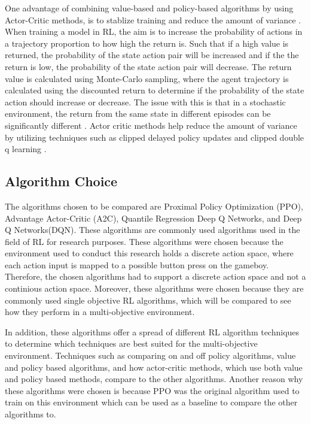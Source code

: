 
One advantage of combining value-based and policy-based algorithms by using Actor-Critic methods, is to stablize training and reduce the amount of variance \cite{SergiosKaragiannakos2018}. When training a model in RL, the aim is to increase the probability of actions in a trajectory proportion to how high the return is. Such that if a high value is returned, the probability of the state action pair will be increased and if the the return is low, the probability of the state action pair will decrease. The return value is calculated using Monte-Carlo sampling, where the agent trajectory is calculated using the discounted return to determine if the probability of the state action should increase or decrease. The issue with this is that in a stochastic environment, the return from the same state in different episodes can be significantly different \cite{ThomasSimonini2022A2C}. Actor critic methods help reduce the amount of variance by utilizing techniques such as clipped delayed policy updates and clipped double q learning \cite{padhye2023deep}.

\subsection{Algorithm Choice}

The algorithms chosen to be compared are Proximal Policy Optimization (PPO), Advantage Actor-Critic (A2C), Quantile Regression Deep Q Networks, and Deep Q Networks(DQN). These algorithms are commonly used algorithms used in the field of RL for research purposes. These algorithms were chosen because the environment used to conduct this research holds a discrete action space, where each action input is mapped to a possible button press on the gameboy. Therefore, the chosen algorithms had to support a discrete action space and not a continious action space. Moreover, these algorithms were chosen because they are commonly used single objective RL algorithms, which will be compared to see how they perform in a multi-objective environment.

In addition, these algorithms offer a spread of different RL algorithm techniques to determine which techniques are best suited for the multi-objective environment. Techniques such as comparing on and off policy algorithms, value and policy based algorithms, and how actor-critic methods, which use both value and policy based methods, compare to the other algorithms. Another reason why these algorithms were chosen is because PPO was the original algorithm used to train on this environment which can be used as a baseline to compare the other algorithms to. 


